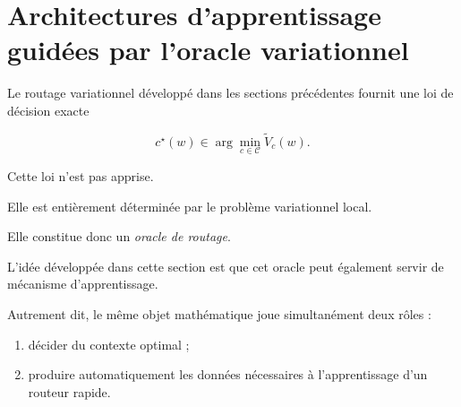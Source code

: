 



























































\section{Architectures d'apprentissage guidées par l'oracle variationnel}

Le routage variationnel développé dans les sections précédentes fournit une
loi de décision exacte

\[
c^\star(w)
\in
\arg\min_{c\in\mathcal C}
\widetilde V_c(w).
\]

Cette loi n'est pas apprise.

Elle est entièrement déterminée par le problème variationnel local.

Elle constitue donc un \emph{oracle de routage}.

L'idée développée dans cette section est que cet oracle peut également servir
de mécanisme d'apprentissage.

Autrement dit, le même objet mathématique joue simultanément deux rôles :

\begin{enumerate}
\item décider du contexte optimal ;
\item produire automatiquement les données nécessaires à l'apprentissage
d'un routeur rapide.
\end{enumerate}

